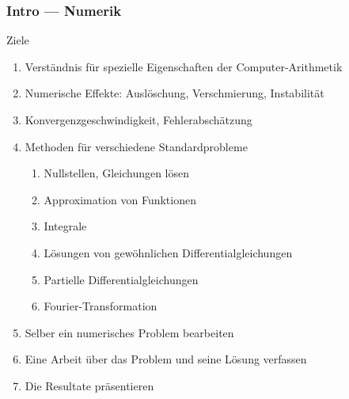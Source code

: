 %
%
%
\begin{frame}
\frametitle{Intro --- Numerik}

\begin{block}{Ziele}
\begin{enumerate}
\item<2->
Verständnis für spezielle Eigenschaften der Computer-Arithmetik
\item<3->
Numerische Effekte: Auslöschung, Verschmierung, Instabilität
\item<4->
Konvergenzgeschwindigkeit, Fehlerabschätzung
\item<5->
Methoden für verschiedene Standardprobleme
\begin{enumerate}
\item<6-> Nullstellen, Gleichungen lösen
\item<7-> Approximation von Funktionen
\item<8-> Integrale
\item<9-> Lösungen von gewöhnlichen Differentialgleichungen
\item<10-> Partielle Differentialgleichungen
\item<11-> Fourier-Transformation
\end{enumerate}
\item<12-> Selber ein numerisches Problem bearbeiten
\item<13-> Eine Arbeit über das Problem und seine Lösung verfassen
\item<14-> Die Resultate präsentieren
\end{enumerate}
\end{block}

\end{frame}
